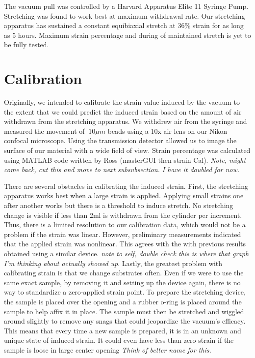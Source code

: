 The vacuum pull was controlled by a Harvard Apparatus Elite 11 Syringe Pump. Stretching was found to work best at maximum withdrawal rate. Our stretching apparatus has sustained a constant equibiaxial stretch at 36\% strain for as long as 5 hours. Maximum strain percentage and during of maintained stretch is yet to be fully tested.


\section{Calibration}
Originally, we intended to calibrate the strain value induced by the vacuum to the extent that we could predict the induced strain based on the amount of air withdrawn from the stretching apparatus. We withdrew air from the syringe and measured the movement of $~10\mu m$ beads using a 10x air lens on our Nikon confocal microscope. Using the transmission detector allowed us to image the surface of our material with a wide field of view. Strain percentage was calculated using MATLAB code written by Ross (masterGUI then strain Cal). \emph{Note, might come back, cut this and move to next subsubsection. I have it doubled for now.}

There are several obstacles in calibrating the induced strain. First, the stretching apparatus works best when a large strain is applied. Applying small strains one after another works but there is a threshold to induce stretch. No stretching change is visible if less than 2ml is withdrawn from the cylinder per increment. Thus, there is a limited resolution to our calibration data, which would not be a problem if the strain was linear. However, preliminary measurements indicated that the applied strain was nonlinear. This agrees with the with previous results \cite{na2008time} obtained using a similar device. \emph{note to self, double check this is where that graph I'm thinking about actually showed up}. Lastly, the greatest problem with calibrating strain is that we change substrates often. Even if we were to use the same exact sample, by removing it and setting up the device again, there is no way to standardize a zero-applied strain point. To prepare the stretching device, the sample is placed over the opening and a rubber o-ring is placed around the sample to help affix it in place. The sample must then be stretched and wiggled around slightly to remove any snags that could jeopardize the vacuum's efficacy. This means that every time a new sample is prepared, it is in an unknown and unique state of induced strain. It could even have less than zero strain if the sample is loose in large center opening \emph{Think of better name for this.} 

